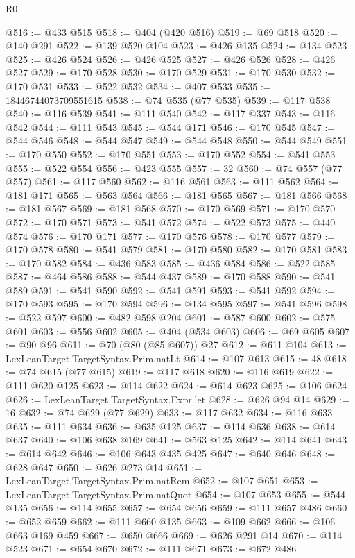 \begin{lexlean}{R0}
\begin{coremodule}
@516 := @433 @515
@518 := @404 (@420 @516)
@519 := @69 @518
@520 := @140 @291
@522 := @139 @520 @104
@523 := @426 @135
@524 := @134 @523
@525 := @426 @524
@526 := @426 @525
@527 := @426 @526
@528 := @426 @527
@529 := @170 @528
@530 := @170 @529
@531 := @170 @530
@532 := @170 @531
@533 := @522 @532
@534 := @407 @533
@535 := 18446744073709551615
@538 := @74 @535 (@77 @535)
@539 := @117 @538
@540 := @116 @539
@541 := @111 @540
@542 := @117 @337
@543 := @116 @542
@544 := @111 @543
@545 := @544 @171
@546 := @170 @545
@547 := @544 @546
@548 := @544 @547
@549 := @544 @548
@550 := @544 @549
@551 := @170 @550
@552 := @170 @551
@553 := @170 @552
@554 := @541 @553
@555 := @522 @554
@556 := @423 @555
@557 := 32
@560 := @74 @557 (@77 @557)
@561 := @117 @560
@562 := @116 @561
@563 := @111 @562
@564 := @181 @171
@565 := @563 @564
@566 := @181 @565
@567 := @181 @566
@568 := @181 @567
@569 := @181 @568
@570 := @170 @569
@571 := @170 @570
@572 := @170 @571
@573 := @541 @572
@574 := @522 @573
@575 := @440 @574
@576 := @170 @171
@577 := @170 @576
@578 := @170 @577
@579 := @170 @578
@580 := @541 @579
@581 := @170 @580
@582 := @170 @581
@583 := @170 @582
@584 := @436 @583
@585 := @436 @584
@586 := @522 @585
@587 := @464 @586
@588 := @544 @437
@589 := @170 @588
@590 := @541 @589
@591 := @541 @590
@592 := @541 @591
@593 := @541 @592
@594 := @170 @593
@595 := @170 @594
@596 := @134 @595
@597 := @541 @596
@598 := @522 @597
@600 := @482 @598 @204
@601 := @587 @600
@602 := @575 @601
@603 := @556 @602
@605 := @404 (@534 @603)
@606 := @69 @605
@607 := @90 @96
@611 := @70 (@80 (@85 @607)) @27
@612 := @611 @104
@613 := LexLeanTarget.TargetSyntax.Prim.natLt
@614 := @107 @613
@615 := 48
@618 := @74 @615 (@77 @615)
@619 := @117 @618
@620 := @116 @619
@622 := @111 @620 @125
@623 := @114 @622
@624 := @614 @623
@625 := @106 @624
@626 := LexLeanTarget.TargetSyntax.Expr.let
@628 := @626 @94 @14
@629 := 16
@632 := @74 @629 (@77 @629)
@633 := @117 @632
@634 := @116 @633
@635 := @111 @634
@636 := @635 @125
@637 := @114 @636
@638 := @614 @637
@640 := @106 @638 @169
@641 := @563 @125
@642 := @114 @641
@643 := @614 @642
@646 := @106 @643 @435 @425
@647 := @640 @646
@648 := @628 @647
@650 := @626 @273 @14
@651 := LexLeanTarget.TargetSyntax.Prim.natRem
@652 := @107 @651
@653 := LexLeanTarget.TargetSyntax.Prim.natQuot
@654 := @107 @653
@655 := @544 @135
@656 := @114 @655
@657 := @654 @656
@659 := @111 @657 @486
@660 := @652 @659
@662 := @111 @660 @135
@663 := @109 @662
@666 := @106 @663 @169 @459
@667 := @650 @666
@669 := @626 @291 @14
@670 := @114 @523
@671 := @654 @670
@672 := @111 @671
@673 := @672 @486

\end{coremodule}
\end{lexlean}
